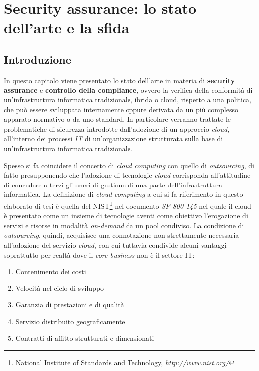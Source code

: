\documentclass[../main.tex]{subfiles}
\begin{document}
\chapter{Security assurance: lo stato dell'arte e la sfida}
\section{Introduzione}
In questo capitolo viene presentato lo stato dell'arte in materia di \textbf{security assurance} e \textbf{controllo della compliance}, ovvero la verifica della conformità di un'infrastruttura informatica tradizionale, ibrida o cloud, rispetto a una politica, che può essere sviluppata internamente oppure derivata da un più complesso apparato normativo o da uno standard.
In particolare verranno trattate le problematiche di sicurezza introdotte dall'adozione di un approccio \textit{cloud}, all'interno dei processi \textit{IT} di un'organizzazione strutturata sulla base di un'infrastruttura informatica tradizionale.

Spesso si fa coincidere il concetto di \textit{cloud computing} con quello di \textit{outsourcing}, di fatto presupponendo che l'adozione di tecnologie \textit{cloud} corrisponda all'attitudine di concedere a terzi gli oneri di gestione di una parte dell'infrastruttura informatica.
La definizione di \textit{cloud computing} a cui si fa riferimento in questo elaborato di tesi è quella del NIST\footnote{National Institute of Standards and Technology, \textit{http://www.nist.org/}} nel documento \textit{SP-800-145} \cite{NISTCloud} nel quale il cloud è presentato come un insieme di tecnologie aventi come obiettivo l'erogazione di servizi e risorse in modalità \textit{on-demand} da un pool condiviso.
La condizione di \textit{outsourcing}, quindi, acquisisce una connotazione non strettamente necessaria all'adozione del servizio \textit{cloud}, con cui tuttavia condivide alcuni vantaggi \cite{OutsourcingCloud} soprattutto per realtà dove il \textit{core business} non è il settore IT:
\begin{enumerate}
\item Contenimento dei costi
\item Velocità nel ciclo di sviluppo
\item Garanzia di prestazioni e di qualità
\item Servizio distribuito geograficamente
\item Contratti di affitto strutturati e dimensionati
\end{enumerate}
\end{document}

